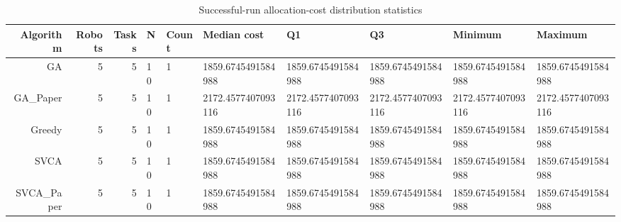 \begin{table}[htbp]
\centering
\small
\caption{Successful-run allocation-cost distribution statistics}
\label{tab:research_smoke_c1_r1_20261122_cost_distribution}
\begin{tabular}{rrrlllllll}
\hline
Algorithm & Robots & Tasks & N & Count & Median cost & Q1 & Q3 & Minimum & Maximum \\
\hline
GA & 5 & 5 & 10 & 1 & 1859.6745491584988 & 1859.6745491584988 & 1859.6745491584988 & 1859.6745491584988 & 1859.6745491584988 \\
GA\_Paper & 5 & 5 & 10 & 1 & 2172.4577407093116 & 2172.4577407093116 & 2172.4577407093116 & 2172.4577407093116 & 2172.4577407093116 \\
Greedy & 5 & 5 & 10 & 1 & 1859.6745491584988 & 1859.6745491584988 & 1859.6745491584988 & 1859.6745491584988 & 1859.6745491584988 \\
SVCA & 5 & 5 & 10 & 1 & 1859.6745491584988 & 1859.6745491584988 & 1859.6745491584988 & 1859.6745491584988 & 1859.6745491584988 \\
SVCA\_Paper & 5 & 5 & 10 & 1 & 1859.6745491584988 & 1859.6745491584988 & 1859.6745491584988 & 1859.6745491584988 & 1859.6745491584988 \\
\hline
\end{tabular}
\end{table}
